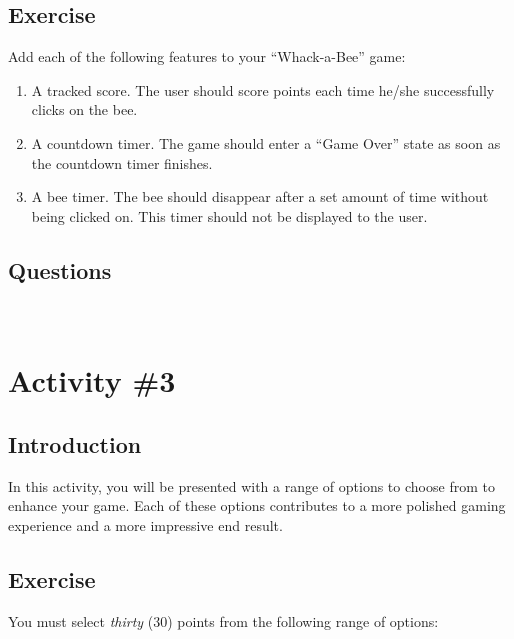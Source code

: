 	\subsection{Exercise}		
		Add each of the following features to your ``Whack-a-Bee'' game:
		\begin{enumerate}
			\item A tracked score. The user should score points each time he/she successfully clicks on the bee.
			\item A countdown timer. The game should enter a ``Game Over'' state as soon as the countdown timer finishes.
			\item A bee timer. The bee should disappear after a set amount of time without being clicked on. This timer should not be displayed to the user.
		\end{enumerate}
	\subsection{Questions}
		\\[9pt]
\pagebreak

\section{Activity \#3}
	\subsection{Introduction}
		In this activity, you will be presented with a range of options to choose from to enhance your game. Each of these options contributes to a more polished gaming experience and a more impressive end result.
	\subsection{Exercise}
		You must select \emph{thirty} ($30$) points from the following range of options:
		
